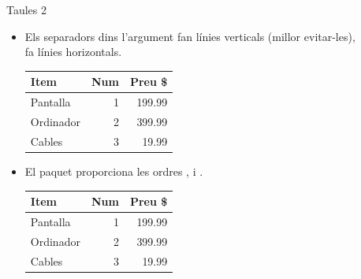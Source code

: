 \begin{frame}[fragile]{Taules 2}
\begin{itemize}
\item Els separadors \keystrokebftt{|} dins l'argument fan línies verticals (millor evitar-les),\\ 
 fa línies horizontals. 
\begin{exampletwouptiny}
\begin{tabular}{|l|r|r|}
    \hline
    Item      & Num & Preu \$ \\
    \hline
    Pantalla  & 1   & 199.99  \\
    Ordinador & 2   & 399.99  \\
    Cables    & 3   & 19.99   \\
    \hline
\end{tabular}
\end{exampletwouptiny}
\item El paquet  proporciona les ordres ,  i . 
\begin{exampletwouptiny}
\begin{tabular}{lrr}
    \toprule
    Item      & Num & Preu \$ \\
    \midrule
    Pantalla  & 1   & 199.99  \\
    Ordinador & 2   & 399.99  \\
    Cables    & 3   & 19.99   \\
    \bottomrule
\end{tabular}
\end{exampletwouptiny}
\end{itemize}
\end{frame}


